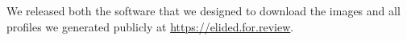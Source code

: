 We released both the software that we designed
to download the images and all profiles we generated
publicly at {\small{\url{https://elided.for.review}}}.

%
%
%
%
%
%
%
